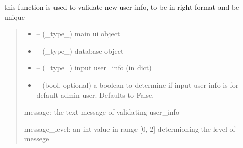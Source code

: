 \documentclass[letterpaper,10pt,english]{sphinxmanual}
\begin{document}
\begin{savenotes}\begin{fulllineitems}
\label{\detokenize{setting/backend/user_management_funcs:oxin.backend.user_management_funcs.new_user_info_validation}}
\pysigstartsignatures
{}
\pysigstopsignatures
\sphinxAtStartPar
this function is used to validate new user info, to be in right format and be unique
\begin{quote}\begin{description}
\begin{itemize}
\item {} 
\sphinxAtStartPar
{} – (\_type\_) main ui object

\item {} 
\sphinxAtStartPar
{} – (\_type\_) database object

\item {} 
\sphinxAtStartPar
{} – (\_type\_) input user\_info (in dict)

\item {} 
\sphinxAtStartPar
{} – (bool, optional) a boolean to determine if input user info is for default admin user. Defaults to False.

\end{itemize}

\sphinxAtStartPar
message: the text message of validating user\_info

\sphinxAtStartPar
message\_level: an int value in range {[}0, 2{]} determioning the level of messege

\end{description}\end{quote}

\end{fulllineitems}\end{savenotes}

\end{document}
